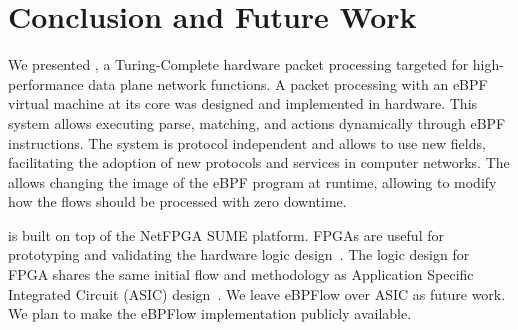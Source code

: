 \section{Conclusion and Future Work}
\label{sec:conclusion}

We presented \system, a Turing-Complete hardware packet processing targeted for high-performance data plane network functions.
A packet processing with an eBPF virtual machine at its core was designed and implemented in hardware. 
This system allows executing parse, matching, and actions dynamically through eBPF instructions.
The system is protocol independent and allows to use new fields, facilitating the adoption of new protocols and services in computer networks.
The \system allows changing the image of the eBPF program at runtime, allowing to modify how the flows should be processed with zero downtime.


\system is built on top of the NetFPGA SUME platform.
FPGAs are useful for prototyping and validating the hardware logic design~\cite{cofer2005rapid,sukhwani2017contutto}. 
The logic design for FPGA shares the same initial flow and methodology as Application Specific Integrated Circuit (ASIC) design~\cite{kuon07measuring,ASICDesignFlow2005}. 
We leave eBPFlow over ASIC as future work.
We plan to make the eBPFlow implementation publicly available.
